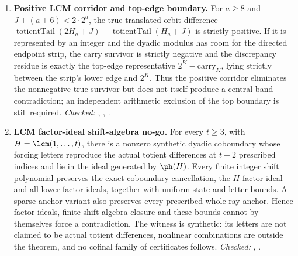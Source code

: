 {\begin{enumerate}[label=\textbf{R\arabic*.},ref=R\arabic*,leftmargin=2.4em,
  itemsep=0.2em,topsep=0.25em]
\item\label{res:actualsign} 
\textbf{Positive LCM corridor and top-edge boundary.}  For $a\ge8$ and
$J+(a+6)<2\cdot2^a$, the true translated orbit difference
$\operatorname{totientTail}(2H_a+J)-\operatorname{totientTail}(H_a+J)$ is
strictly positive.  If it is represented by an integer and the dyadic
modulus has room for the directed endpoint strip, the carry survivor is
strictly negative and the discrepancy residue is exactly the top-edge
representative $2^K-\text{carry}_K$, lying strictly between the strip's lower
edge and $2^K$.  Thus the positive corridor eliminates the nonnegative true
survivor but does not itself produce a central-band contradiction; an
independent arithmetic exclusion of the top boundary is still required.
{\footnotesize\emph{Checked:}
,
,
.}

\item\label{res:factorideal} 
\textbf{LCM factor-ideal shift-algebra no-go.}  For every $t\ge3$, with
$H=\lcm(1,\ldots,t)$, there is a nonzero synthetic dyadic coboundary whose
forcing letters reproduce the actual totient differences at $t-2$ prescribed
indices and lie in the ideal generated by $\ph(H)$.  Every finite integer
shift polynomial preserves the exact coboundary cancellation, the $H$-factor
ideal and all lower factor ideals, together with uniform state and letter
bounds.  A sparse-anchor variant also preserves every prescribed whole-ray
anchor.  Hence factor ideals, finite shift-algebra closure and these bounds
cannot by themselves force a contradiction.  The witness is synthetic: its
letters are not claimed to be actual totient differences, nonlinear
combinations are outside the theorem, and no cofinal family of certificates
follows.
{\footnotesize\emph{Checked:}
,
.}


\end{enumerate}}
